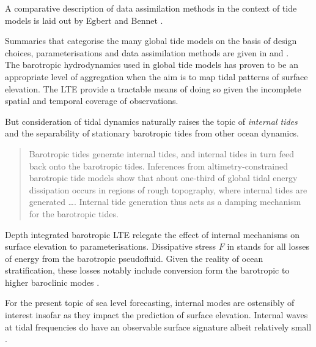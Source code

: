 A comparative description of data assimilation methods in the context of tide models is laid out by Egbert and Bennet \cite{Egbert:1996vr}.



Summaries that categorise the many global tide models on the basis of design choices, parameterisations and data assimilation methods are given in \cite{Ardalan:2008gs} and \cite{Matsumoto:2000tg}. \\


The barotropic hydrodynamics used in global tide models has proven to be an appropriate level of aggregation when the aim is to map tidal patterns of surface elevation.  The LTE provide a tractable means of doing so given the incomplete spatial and temporal coverage of observations.

But consideration of tidal dynamics naturally raises the topic of \emph{internal tides} and the separability of stationary barotropic tides from other ocean dynamics.
\begin{quotation}
Barotropic tides generate internal tides, and internal tides in turn feed back onto the barotropic tides. Inferences from altimetry-constrained barotropic tide models show that about one-third of global tidal energy dissipation occurs in regions of rough topography, where internal tides are generated \dots{}. Internal tide generation thus acts as a damping mechanism for the barotropic tides.\citep[pp22]{Arbic:hy}
\end{quotation}
Depth integrated barotropic LTE relegate the effect of internal mechanisms on surface elevation to parameterisations.  Dissipative stress $F$ in \label{E:LTE_momtm} stands for all losses of energy from the barotropic pseudofluid.  Given the reality of ocean stratification, these losses notably include conversion form the barotropic to higher baroclinic modes \cite[pp121] {gill1982atmosphere}.


For the present topic of sea level forecasting, internal modes are ostensibly of interest insofar as they impact the prediction of surface elevation.  Internal waves at tidal frequencies do have an observable surface signature albeit relatively small \cite{Ray:2011tj}.

